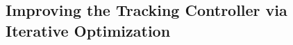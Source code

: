 





\vspace{-5pt}
\subsection{Improving the Tracking Controller via Iterative Optimization}
\label{sec:method_iteration}
\vspace{-5pt}


